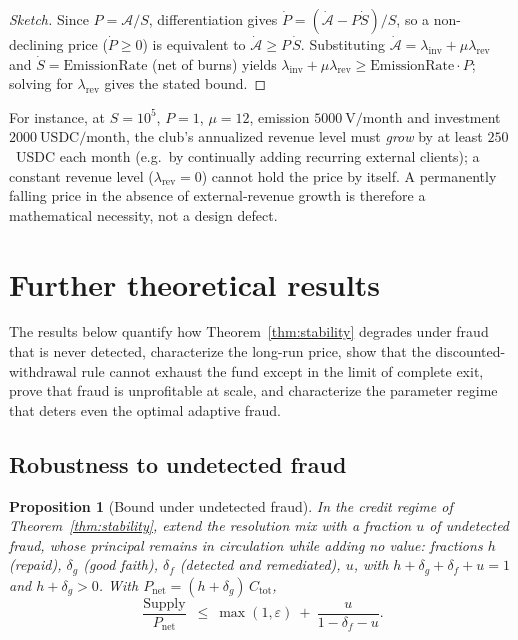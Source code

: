 \documentclass[11pt]{article}
\theoremstyle{plain}
\newtheorem{proposition}{Proposition}
\theoremstyle{definition}
\theoremstyle{remark}
\newcommand{\V}{\mathrm{V}}
\newcommand{\Supply}{\operatorname{Supply}}
\begin{document}
\begin{proof}[Sketch]
Since $P = \mathcal{A}/S$, differentiation gives $\dot P = (\dot{\mathcal{A}} - P\dot S)/S$, so a non-declining price ($\dot P \ge 0$) is equivalent to $\dot{\mathcal{A}} \ge P\,\dot S$. Substituting $\dot{\mathcal{A}} = \lambda_{\mathrm{inv}} + \mu\lambda_{\mathrm{rev}}$ and $\dot S = \mathrm{EmissionRate}$ (net of burns) yields $\lambda_{\mathrm{inv}} + \mu\lambda_{\mathrm{rev}} \ge \mathrm{EmissionRate}\cdot P$; solving for $\lambda_{\mathrm{rev}}$ gives the stated bound.
\end{proof}

For instance, at $S = 10^5$, $P = 1$, $\mu = 12$, emission $5000~\V/\text{month}$ and investment $2000~\text{USDC}/\text{month}$, the club's annualized revenue level must \emph{grow} by at least $250$~USDC each month (e.g.\ by continually adding recurring external clients); a constant revenue level ($\lambda_{\mathrm{rev}}=0$) cannot hold the price by itself. A permanently falling price in the absence of external-revenue growth is therefore a mathematical necessity, not a design defect.

\section{Further theoretical results}\label{sec:further}

The results below quantify how Theorem~\ref{thm:stability} degrades under fraud that is never detected, characterize the long-run price, show that the discounted-withdrawal rule cannot exhaust the fund except in the limit of complete exit, prove that fraud is unprofitable at scale, and characterize the parameter regime that deters even the optimal adaptive fraud.

\subsection{Robustness to undetected fraud}

\begin{proposition}[Bound under undetected fraud]\label{prop:genstab}
In the credit regime of Theorem~\ref{thm:stability}, extend the resolution mix with a fraction $u$ of \emph{undetected} fraud, whose principal remains in circulation while adding no value: fractions $h$ (repaid), $\delta_g$ (good faith), $\delta_f$ (detected and remediated), $u$, with $h+\delta_g+\delta_f+u=1$ and $h+\delta_g>0$. With $P_{\mathrm{net}}=(h+\delta_g)\,C_{\mathrm{tot}}$,
\[
\frac{\Supply}{P_{\mathrm{net}}}\ \le\ \max(1,\varepsilon)\ +\ \frac{u}{1-\delta_f-u}.
\]
\end{proposition}
\end{document}
